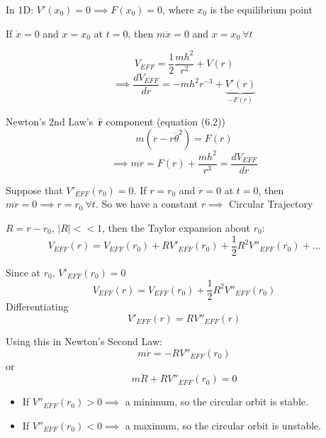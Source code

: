 \documentclass[twoside]{scrartcl}
\let\oldhat\hat
\renewcommand{\hat}[1]{\,\oldhat{\boldsymbol{\mathbf{#1}}}}
\begin{document}
In 1D: $V'(x_0) = 0 \implies F(x_0) = 0$, where $x_0$ is the equilibrium point

If $\dot{x} = 0$ and $x = x_0$ at $t = 0$, then $m\ddot{x} = 0$ and $x = x_0~\forall t$

\[V_{EFF} =\dfrac{1}{2}\dfrac{mh^2}{r^2} + V(r)\]
\[\implies \frac{dV_{EFF}}{dr} = -mh^2r^{-3} + \underbrace{V'(r)}_{-F(r)}\]

Newton's 2nd Law's $\hat{r}$ component (equation (6.2))
\[m(\ddot{r} - r\dot{\theta}^2) = F(r)\]
\[\implies m\ddot{r} = F(r) + \frac{mh^2}{r^3} = \frac{dV_{EFF}}{dr}\]

Suppose that $V'_{EFF}(r_0) = 0$. If $r = r_0$ and $\dot{r} = 0$ at $t = 0$, then $m\ddot{r} = 0 \implies r = r_0~\forall t$. So we have a constant $r\implies $ Circular Trajectory

$R = r-r_0$, $|R| << 1$, then the Taylor expansion about $r_0$:
\begin{equation}V_{EFF}(r) = V_{EFF}(r_0) + RV'_{EFF}(r_0) + \frac{1}{2}R^2V''_{EFF}(r_0) + \dots	
\end{equation}


Since at $r_0$, $V'_{EFF}(r_0) = 0$
\[V_{EFF}(r) = V_{EFF}(r_0) + \frac{1}{2}R^2V''_{EFF}(r_0)\]
Differentiating
\[V'_{EFF}(r) = RV''_{EFF}(r)\]

Using this in Newton's Second Law: 
\[m\ddot{r} = -RV''_{EFF}(r_0)\]
or 
\[m\ddot{R} + RV''_{EFF}(r_0)= 0\]

\begin{itemize}
\item If $V''_{EFF}(r_0)>0 \implies$ a minimum, so the circular orbit is stable.

\item If $V''_{EFF}(r_0) < 0 \implies$ a maximum, so the circular orbit is unstable. 
\end{itemize}~
\end{document}
